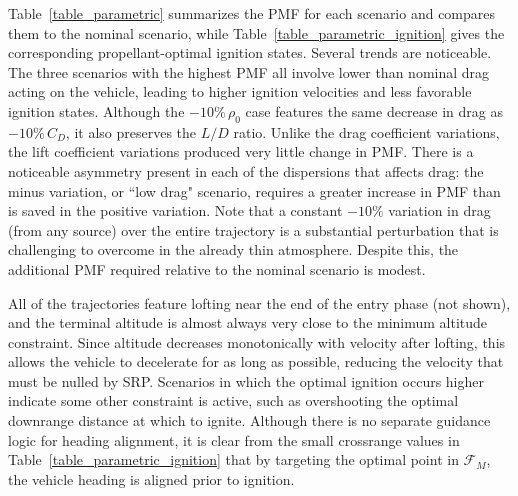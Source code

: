 \documentclass[letterpaper, paper,11pt]{AAS}
\begin{document}
Table~\ref{table_parametric} summarizes the PMF for each scenario and compares them to the nominal scenario, while Table~\ref{table_parametric_ignition} gives the corresponding propellant-optimal ignition states. Several trends are noticeable. The three scenarios with the highest PMF all involve lower than nominal drag acting on the vehicle, leading to higher ignition velocities and less favorable ignition states. Although the $-10\%\, \rho_0$ case features the same decrease in drag as $-10\%\,C_D$, it also preserves the $L/D$ ratio. Unlike the drag coefficient variations, the lift coefficient variations produced very little change in PMF.
There is a noticeable asymmetry present in each of the dispersions that affects drag: the minus variation, or ``low drag" scenario, requires a greater increase in PMF than is saved in the positive variation. Note that a constant $-10\%$ variation in drag (from any source) over the entire trajectory is a substantial perturbation that is challenging to overcome in the already thin atmosphere. Despite this, the additional PMF required relative to the nominal scenario is modest.

All of the trajectories feature lofting near the end of the entry phase (not shown), and the terminal altitude is almost always very close to the minimum altitude constraint. Since altitude decreases monotonically with velocity after lofting, this allows the vehicle to decelerate for as long as possible, reducing the velocity that must be nulled by SRP. Scenarios in which the optimal ignition occurs higher indicate some other constraint is active, such as overshooting the optimal downrange distance at which to ignite. Although there is no separate guidance logic for heading alignment, it is clear from the small crossrange values in Table~\ref{table_parametric_ignition} that by targeting the optimal point in $\mathcal{F}_M$, the vehicle heading is aligned prior to ignition. 
\end{document}
